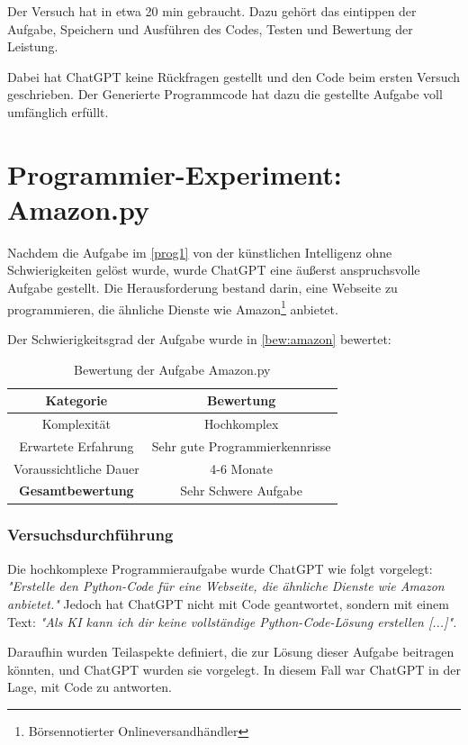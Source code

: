 Der Versuch hat in etwa 20 min gebraucht. Dazu gehört das eintippen der Aufgabe, Speichern und Ausführen des Codes, Testen und Bewertung der Leistung.

Dabei hat ChatGPT keine Rückfragen gestellt und den Code beim ersten Versuch geschrieben. Der Generierte Programmcode hat dazu die gestellte Aufgabe voll umfänglich erfüllt.



\section{Programmier-Experiment: Amazon.py}
\label{prog2}
Nachdem die Aufgabe im \autoref{prog1} von der künstlichen Intelligenz ohne Schwierigkeiten gelöst wurde, wurde ChatGPT eine äußerst anspruchsvolle Aufgabe gestellt. Die Herausforderung bestand darin, eine Webseite zu programmieren, die ähnliche Dienste wie Amazon\footnote{Börsennotierter Onlineversandhändler} anbietet.

Der Schwierigkeitsgrad der Aufgabe wurde in \autoref{bew:amazon} bewertet:

\begin{table}[h]
\centering
\begin{tabular}{|c|c|}
\hline
\textbf{Kategorie} & \textbf{Bewertung}  \\ \hline
Komplexität & Hochkomplex \\ \hline
Erwartete Erfahrung & Sehr gute Programmierkennrisse  \\ \hline
Voraussichtliche Dauer & 4-6 Monate \\ \hline
\textbf{Gesamtbewertung} & Sehr Schwere Aufgabe \\ \hline
\end{tabular}
\caption{Bewertung der Aufgabe Amazon.py}
\label{bew:amazon}
\end{table}

\subsubsection{Versuchsdurchführung}
Die hochkomplexe Programmieraufgabe wurde ChatGPT wie folgt vorgelegt: 
\emph{"Erstelle den Python-Code für eine Webseite, die ähnliche Dienste wie Amazon anbietet."} Jedoch hat ChatGPT nicht mit Code geantwortet, sondern mit einem Text: \emph{ "Als KI kann ich dir keine vollständige Python-Code-Lösung erstellen [...]".}

Daraufhin wurden Teilaspekte definiert, die zur Lösung dieser Aufgabe beitragen könnten, und ChatGPT wurden sie vorgelegt. In diesem Fall war ChatGPT in der Lage, mit Code zu antworten.

